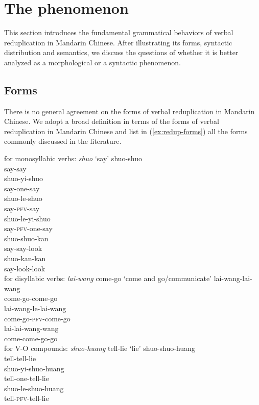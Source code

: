\section{The phenomenon}\label{sec:phen}

This section introduces the fundamental grammatical behaviors of verbal reduplication in Mandarin Chinese.
 After illustrating its forms, syntactic distribution and semantics, 
 we discuss the questions of whether it is better analyzed as a morphological or a syntactic phenomenon.


\subsection{Forms}\label{sec:forms}

There is no general agreement on the forms of verbal reduplication in Mandarin Chinese.
We adopt a broad definition in terms of the forms of verbal reduplication in Mandarin Chinese 
and list in (\ref{ex:redup-forms}) all the forms commonly discussed in the literature.

\settowidth{}

\ea\label{ex:redup-forms}
	\ea for monosyllabic verbs: \textit{shuo} `say'
		\ea \gll shuo-shuo\\
		say-say\\
		\ex \gll shuo-yi-shuo\\
		say-one-say\\
		\ex \gll shuo-le-shuo\\
		say-\textsc{pfv}-say\\
		\ex \gll shuo-le-yi-shuo\\
		say-\textsc{pfv}-one-say\\
		\ex \gll shuo-shuo-kan\\
		say-say-look\\
		\ex \gll shuo-kan-kan\\
		 say-look-look\\
		\z
	\ex for disyllabic verbs: \textit{lai-wang} come-go `come and go/communicate'
		\ea \gll lai-wang-lai-wang\\
		come-go-come-go\\ 
		\ex \gll lai-wang-le-lai-wang\\
		come-go-\textsc{pfv}-come-go\\ 
		\ex \gll lai-lai-wang-wang\\
		come-come-go-go\\ 
		\z
	\ex\label{ex:forms-VO} for V-O compounds: \textit{shuo-huang} tell-lie `lie'
		\ea \gll shuo-shuo-huang\\
		tell-tell-lie\\ 
		\ex \gll shuo-yi-shuo-huang\\
		tell-one-tell-lie\\ 
		\ex \gll shuo-le-shuo-huang\\
		tell-\textsc{pfv}-tell-lie\\ 
		\z
	\z
\z



